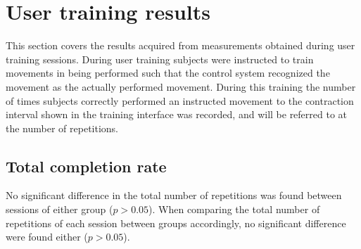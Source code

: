 
\section{User training results} \label{sec:R:userTraining}
This section covers the results acquired from measurements obtained during user training sessions. During user training subjects were instructed to train movements in being performed such that the control system recognized the movement as the actually performed movement. During this training the number of times subjects correctly performed an instructed movement to the contraction interval shown in the training interface was recorded, and will be referred to at the number of repetitions.

\subsection{Total completion rate}
No significant difference in the total number of repetitions was found between sessions of either group ($p > 0.05$). When comparing the total number of repetitions of each session between groups accordingly, no significant difference were found either ($p > 0.05$).
%

